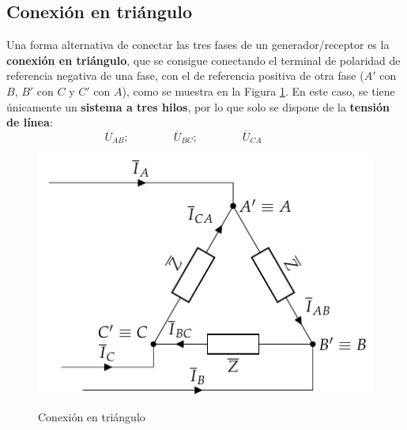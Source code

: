 	\subsection{Conexión en triángulo}\label{sec.triangulo}
	
	Una forma alternativa de conectar las tres fases de un generador/receptor es la \textbf{conexión en triángulo}, que se consigue conectando el terminal de polaridad de referencia negativa de una fase, con el de referencia positiva de otra fase ($A'$ con $B$, $B'$ con $C$ y $C'$ con $A$), como se muestra en la Figura \ref{fig.conexion_triangulo}. En este caso, se tiene únicamente un \textbf{sistema a tres hilos}, por lo que solo se dispone de la \textbf{tensión de línea}: 
	\begin{equation*}
	    \overline{U}_{AB};\qquad\qquad \overline{U}_{BC};\qquad\qquad \overline{U}_{CA}\qquad\qquad
	\end{equation*}
	\begin{figure}[H]
		\centering
		{\includegraphics{../figs/TrianguloEquilibrado_Receptor.pdf}}
		\caption{Conexión en triángulo}
		\label{fig.conexion_triangulo}
	\end{figure}
	
